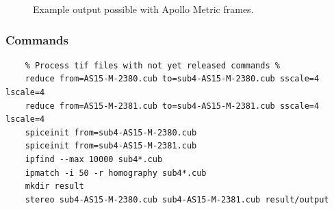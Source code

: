 \begin{figure}[h!]
\centering
  \hfil
\caption{Example output possible with Apollo Metric frames.}
\label{fig:metric_example}
\end{figure}

\subsubsection*{Commands}

\begin{verbatim}
    % Process tif files with not yet released commands %
    reduce from=AS15-M-2380.cub to=sub4-AS15-M-2380.cub sscale=4 lscale=4
    reduce from=AS15-M-2381.cub to=sub4-AS15-M-2381.cub sscale=4 lscale=4
    spiceinit from=sub4-AS15-M-2380.cub
    spiceinit from=sub4-AS15-M-2381.cub
    ipfind --max 10000 sub4*.cub
    ipmatch -i 50 -r homography sub4*.cub
    mkdir result
    stereo sub4-AS15-M-2380.cub sub4-AS15-M-2381.cub result/output
\end{verbatim}

